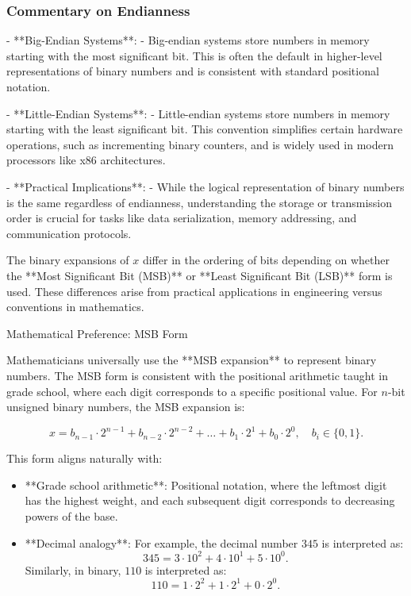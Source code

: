 \subsubsection{Commentary on Endianness}
- **Big-Endian Systems**:
  - Big-endian systems store numbers in memory starting with the most significant bit. This is often the default in higher-level representations of binary numbers and is consistent with standard positional notation.

- **Little-Endian Systems**:
  - Little-endian systems store numbers in memory starting with the least significant bit. This convention simplifies certain hardware operations, such as incrementing binary counters, and is widely used in modern processors like x86 architectures.

- **Practical Implications**:
  - While the logical representation of binary numbers is the same regardless of endianness, understanding the storage or transmission order is crucial for tasks like data serialization, memory addressing, and communication protocols.


The binary expansions of \( x \) differ in the ordering of bits depending on whether the **Most Significant Bit (MSB)** or **Least Significant Bit (LSB)** form is used. These differences arise from practical applications in engineering versus conventions in mathematics.

Mathematical Preference: MSB Form

Mathematicians universally use the **MSB expansion** to represent binary numbers. The MSB form is consistent with the positional arithmetic taught in grade school, where each digit corresponds to a specific positional value. For \( n \)-bit unsigned binary numbers, the MSB expansion is:

\[
x = b_{n-1} \cdot 2^{n-1} + b_{n-2} \cdot 2^{n-2} + \dots + b_1 \cdot 2^1 + b_0 \cdot 2^0, \quad b_i \in \{0, 1\}.
\]

This form aligns naturally with:
\begin{itemize}[noitemsep, left=1cm, topsep=0pt]
    \item **Grade school arithmetic**: Positional notation, where the leftmost digit has the highest weight, and each subsequent digit corresponds to decreasing powers of the base.
    \item **Decimal analogy**: For example, the decimal number \( 345 \) is interpreted as:
    \[
    345 = 3 \cdot 10^2 + 4 \cdot 10^1 + 5 \cdot 10^0.
    \]
    Similarly, in binary, \( 110 \) is interpreted as:
    \[
    110 = 1 \cdot 2^2 + 1 \cdot 2^1 + 0 \cdot 2^0.
    \]
\end{itemize}

